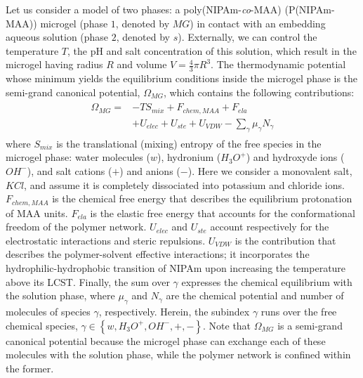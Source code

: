 Let us consider a model of two phases: a poly(NIPAm-\emph{co}-MAA) (P(NIPAm-MAA)) microgel (phase $1$, denoted by $MG$) in contact with an embedding aqueous solution (phase $2$, denoted by $s$).
Externally, we can control the temperature $T$, the pH and salt concentration of this solution, which result in the microgel having radius $R$ and volume $V=\frac{4}{3}\pi R^3$.
The thermodynamic potential whose minimum yields the equilibrium conditions inside the microgel phase is the semi-grand canonical potential, $\Omega_{MG}$, which contains the following contributions:
%
\begin{align}
    \begin{aligned}
       \Omega_{MG}=& -TS_{mix} + F_{chem,MAA} +  F_{ela}\\
       & + U_{elec}+  U_{ste} + U_{VDW} -{\sum_{\gamma}
        {\mu_\gamma N_\gamma}}
    \end{aligned}
    \label{eq:free-energy-implicit}
\end{align}
%
\noindent where $S_{mix}$ is the translational (mixing) entropy of the free species in the microgel phase: water molecules ($w$), hydronium ($H_3O^+$) and hydroxyde  ions ($OH^-$), and salt cations ($+$) and anions ($-$). 
Here we consider a monovalent salt, $KCl$, and assume it is completely dissociated into potassium and chloride ions.
$F_{chem,MAA}$ is the chemical free energy that describes the equilibrium protonation of MAA units.
$F_{ela}$ is the elastic free energy that accounts for the conformational freedom of the polymer network.
$U_{elec}$ and $U_{ste}$ account respectively for the electrostatic interactions and steric repulsions.
$U_{VDW}$ is the contribution that describes the polymer-solvent effective interactions; it incorporates the hydrophilic-hydrophobic transition of NIPAm upon increasing the temperature above its LCST.
Finally, the sum over $\gamma$ expresses the chemical equilibrium with the solution phase, where $\mu_\gamma$ and $N_\gamma$ are the chemical potential and number of molecules of species $\gamma$, respectively.
Herein, the subindex $\gamma$ runs over the free chemical species, $\gamma \in \left\{ w, H_3O^+, OH^-, +,- \right\}$.
Note that $\Omega_{MG}$ is a semi-grand canonical potential because the microgel phase can exchange each of these molecules with the solution phase, while the polymer network is confined within the former.


